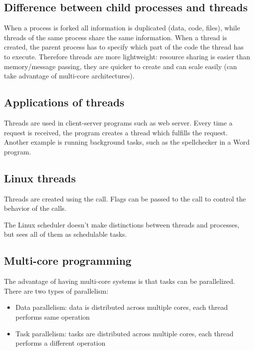 
\subsection{Difference between child processes and threads}
When a process is forked all information is duplicated (data, code, files), while threads of the same process share the same information. When a thread is created, the parent process has to specify which part of the code the thread has to execute. Therefore threads are more lightweight: resource sharing is easier than memory/message passing, they are quicker to create and can scale easily (can take advantage of multi-core architectures).

\subsection{Applications of threads}
Threads are used in client-server programs such as web server. Every time a request is received, the program creates a thread which fulfills the request. Another example is running background tasks, such as the spellchecker in a Word program.

\subsection{Linux threads}
Threads are created using the  call. Flags can be passed to the call to control the behavior of the calls.

The Linux scheduler doesn't make distinctions between threads and processes, but sees all of them as schedulable tasks.

\subsection{Multi-core programming}
The advantage of having multi-core systems is that tasks can be parallelized. There are two types of parallelism:
\begin{itemize}
  \item Data parallelism: data is distributed across multiple cores, each thread performs same operation
  \item Task parallelism: tasks are distributed across multiple cores, each thread performs a different operation
\end{itemize}

